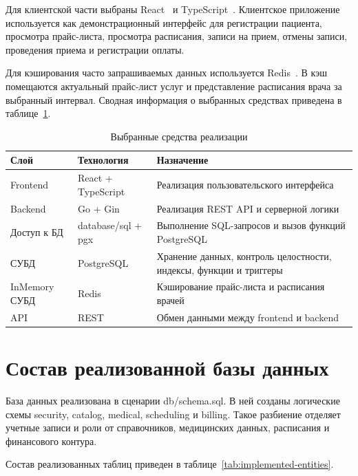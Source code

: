 Для клиентской части выбраны React~\cite{react_docs} и TypeScript~\cite{typescript_docs}. Клиентское приложение используется как демонстрационный интерфейс для регистрации пациента, просмотра прайс-листа, просмотра расписания, записи на прием, отмены записи, проведения приема и регистрации оплаты.

Для кэширования часто запрашиваемых данных используется Redis~\cite{redis_docs}. В кэш помещаются актуальный прайс-лист услуг и представление расписания врача за выбранный интервал. Сводная информация о выбранных средствах приведена в таблице~\ref{tab:stack}.

\begin{table}[H]
    \centering
    \caption{Выбранные средства реализации}
    \label{tab:stack}
    \small
    \begin{tabularx}{\textwidth}{|>{\raggedright\arraybackslash}p{3.3cm}|>{\raggedright\arraybackslash}p{4.2cm}|>{\raggedright\arraybackslash}X|}
        \hline
        Слой & Технология & Назначение \tabularnewline
        \hline
        Frontend & React + TypeScript & Реализация пользовательского интерфейса \tabularnewline
        \hline
        Backend & Go + Gin & Реализация REST API и серверной логики \tabularnewline
        \hline
        Доступ к БД & database/sql + pgx & Выполнение SQL-запросов и вызов функций PostgreSQL \tabularnewline
        \hline
        СУБД & PostgreSQL & Хранение данных, контроль целостности, индексы, функции и триггеры \tabularnewline
        \hline
        InMemory СУБД & Redis & Кэширование прайс-листа и расписания врачей \tabularnewline
        \hline
        API & REST & Обмен данными между frontend и backend \tabularnewline
        \hline
    \end{tabularx}
\end{table}
\normalsize

\section{Состав реализованной базы данных}

База данных реализована в сценарии db/schema.sql. В ней созданы логические схемы security, catalog, medical, scheduling и billing. Такое разбиение отделяет учетные записи и роли от справочников, медицинских данных, расписания и финансового контура.

Состав реализованных таблиц приведен в таблице~\ref{tab:implemented-entities}.

